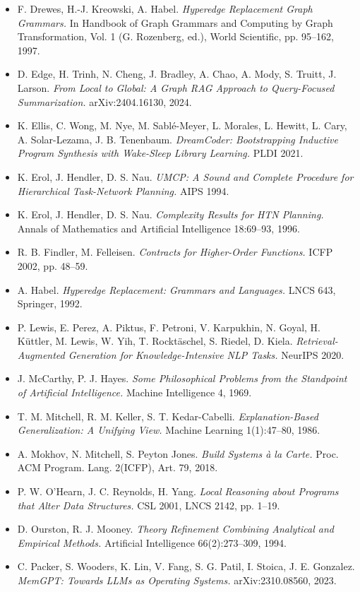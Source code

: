\documentclass[11pt]{article}
\begin{document}
\begin{itemize}
\item F. Drewes, H.-J. Kreowski, A. Habel. \emph{Hyperedge Replacement Graph Grammars.} In Handbook of Graph Grammars and Computing by Graph Transformation, Vol. 1 (G. Rozenberg, ed.), World Scientific, pp. 95–162, 1997.
\item D. Edge, H. Trinh, N. Cheng, J. Bradley, A. Chao, A. Mody, S. Truitt, J. Larson. \emph{From Local to Global: A Graph RAG Approach to Query-Focused Summarization.} arXiv:2404.16130, 2024.
\item K. Ellis, C. Wong, M. Nye, M. Sablé-Meyer, L. Morales, L. Hewitt, L. Cary, A. Solar-Lezama, J. B. Tenenbaum. \emph{DreamCoder: Bootstrapping Inductive Program Synthesis with Wake-Sleep Library Learning.} PLDI 2021.
\item K. Erol, J. Hendler, D. S. Nau. \emph{UMCP: A Sound and Complete Procedure for Hierarchical Task-Network Planning.} AIPS 1994.
\item K. Erol, J. Hendler, D. S. Nau. \emph{Complexity Results for HTN Planning.} Annals of Mathematics and Artificial Intelligence 18:69–93, 1996.
\item R. B. Findler, M. Felleisen. \emph{Contracts for Higher-Order Functions.} ICFP 2002, pp. 48–59.
\item A. Habel. \emph{Hyperedge Replacement: Grammars and Languages.} LNCS 643, Springer, 1992.
\item P. Lewis, E. Perez, A. Piktus, F. Petroni, V. Karpukhin, N. Goyal, H. Küttler, M. Lewis, W. Yih, T. Rocktäschel, S. Riedel, D. Kiela. \emph{Retrieval-Augmented Generation for Knowledge-Intensive NLP Tasks.} NeurIPS 2020.
\item J. McCarthy, P. J. Hayes. \emph{Some Philosophical Problems from the Standpoint of Artificial Intelligence.} Machine Intelligence 4, 1969.
\item T. M. Mitchell, R. M. Keller, S. T. Kedar-Cabelli. \emph{Explanation-Based Generalization: A Unifying View.} Machine Learning 1(1):47–80, 1986.
\item A. Mokhov, N. Mitchell, S. Peyton Jones. \emph{Build Systems à la Carte.} Proc. ACM Program. Lang. 2(ICFP), Art. 79, 2018.
\item P. W. O'Hearn, J. C. Reynolds, H. Yang. \emph{Local Reasoning about Programs that Alter Data Structures.} CSL 2001, LNCS 2142, pp. 1–19.
\item D. Ourston, R. J. Mooney. \emph{Theory Refinement Combining Analytical and Empirical Methods.} Artificial Intelligence 66(2):273–309, 1994.
\item C. Packer, S. Wooders, K. Lin, V. Fang, S. G. Patil, I. Stoica, J. E. Gonzalez. \emph{MemGPT: Towards LLMs as Operating Systems.} arXiv:2310.08560, 2023.

\end{itemize}
\end{document}
